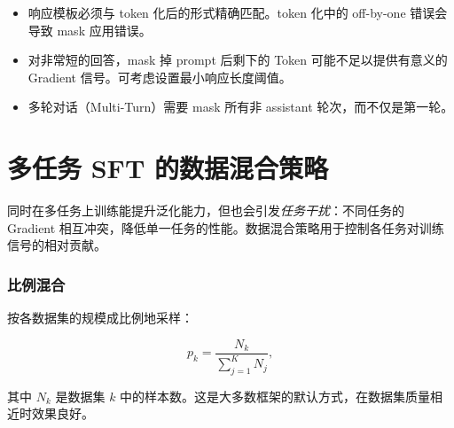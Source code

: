 \begin{warningbox}
\begin{itemize}
  \item 响应模板必须与 token 化后的形式精确匹配。token 化中的 off-by-one 错误会导致 mask 应用错误。
  \item 对非常短的回答，mask 掉 prompt 后剩下的 Token 可能不足以提供有意义的 Gradient 信号。可考虑设置最小响应长度阈值。
  \item 多轮对话（Multi-Turn）需要 mask 所有非 assistant 轮次，而不仅是第一轮。
\end{itemize}
\end{warningbox}

\section{多任务 SFT 的数据混合策略}
\label{sec:data-mixing}

\begin{intuitionbox}[多任务挑战]
同时在多任务上训练能提升泛化能力，但也会引发\emph{任务干扰}：不同任务的 Gradient 相互冲突，降低单一任务的性能。数据混合策略用于控制各任务对训练信号的相对贡献。
\end{intuitionbox}

\subsubsection*{比例混合}
\label{proportional-mixing}

按各数据集的规模成比例地采样：

\[
p_k = \frac{N_k}{\sum_{j=1}^K N_j},
\]

其中 $N_k$ 是数据集 $k$ 中的样本数。这是大多数框架的默认方式，在数据集质量相近时效果良好。

